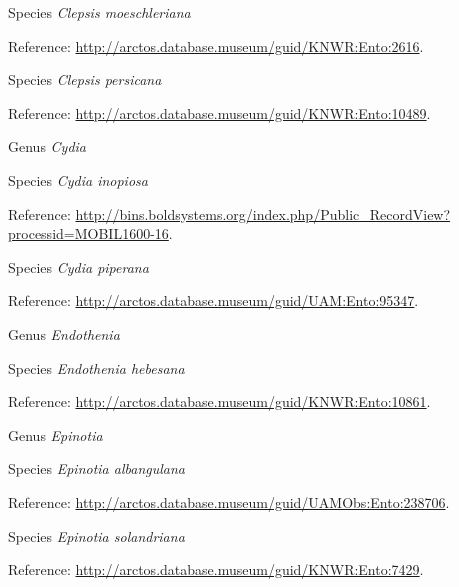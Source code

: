 \documentclass[9pt, article]{memoir}
\begin{document}
\begin{multicols}{2}
\vspace{6pt}\noindent\hspace{36pt}Species \textit{Clepsis moeschleriana}


Reference: 
\url{http://arctos.database.museum/guid/KNWR:Ento:2616}.

\vspace{6pt}\noindent\hspace{36pt}Species \textit{Clepsis persicana}


Reference: 
\url{http://arctos.database.museum/guid/KNWR:Ento:10489}.

\vspace{6pt}\noindent\hspace{30pt}Genus \textit{Cydia}


\vspace{6pt}\noindent\hspace{36pt}Species \textit{Cydia inopiosa}


Reference: 
\url{http://bins.boldsystems.org/index.php/Public_RecordView?processid=MOBIL1600-16}.

\vspace{6pt}\noindent\hspace{36pt}Species \textit{Cydia piperana}


Reference: 
\url{http://arctos.database.museum/guid/UAM:Ento:95347}.

\vspace{6pt}\noindent\hspace{30pt}Genus \textit{Endothenia}


\vspace{6pt}\noindent\hspace{36pt}Species \textit{Endothenia hebesana}


Reference: 
\url{http://arctos.database.museum/guid/KNWR:Ento:10861}.

\vspace{6pt}\noindent\hspace{30pt}Genus \textit{Epinotia}


\vspace{6pt}\noindent\hspace{36pt}Species \textit{Epinotia albangulana}


Reference: 
\url{http://arctos.database.museum/guid/UAMObs:Ento:238706}.

\vspace{6pt}\noindent\hspace{36pt}Species \textit{Epinotia solandriana}


Reference: 
\url{http://arctos.database.museum/guid/KNWR:Ento:7429}.


\end{multicols}
\end{document}
